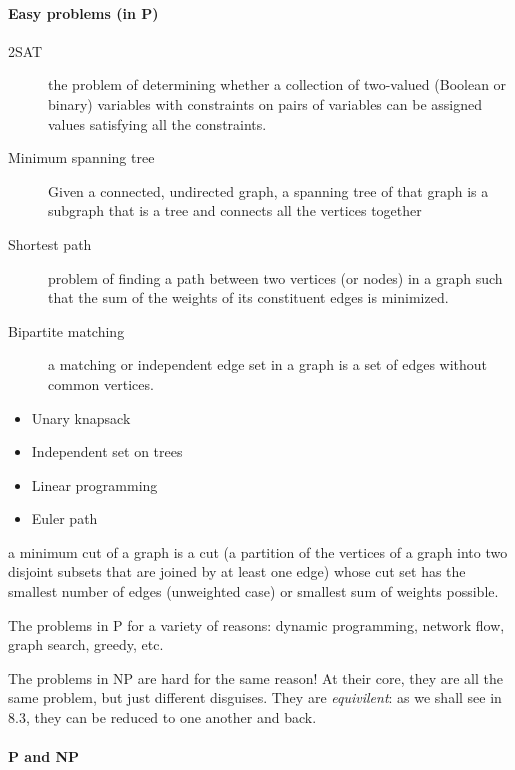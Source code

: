 \documentclass[a4paper,11pt]{article}
\begin{document}
\paragraph{Easy problems (in P)}\label{easy-problems-in-p}

\begin{description}
\item[2SAT]
the problem of determining whether a collection of two-valued (Boolean
or binary) variables with constraints on pairs of variables can be
assigned values satisfying all the constraints.
\item[Minimum spanning tree]
Given a connected, undirected graph, a spanning tree of that graph is a
subgraph that is a tree and connects all the vertices together
\item[Shortest path]
problem of finding a path between two vertices (or nodes) in a graph
such that the sum of the weights of its constituent edges is minimized.
\item[Bipartite matching]
a matching or independent edge set in a graph is a set of edges without
common vertices.
\end{description}

\begin{itemize}
\itemsep1pt\parskip0pt
\item
  Unary knapsack
\item
  Independent set on trees
\item
  Linear programming
\item
  Euler path
\end{itemize}

\begin{description}
\itemsep1pt\parskip0pt
\item[Minimum cut]
a minimum cut of a graph is a cut (a partition of the vertices of a
graph into two disjoint subsets that are joined by at least one edge)
whose cut set has the smallest number of edges (unweighted case) or
smallest sum of weights possible.
\end{description}

The problems in P for a variety of reasons: dynamic programming, network
flow, graph search, greedy, etc.

The problems in NP are hard for the same reason! At their core, they are
all the same problem, but just different disguises. They are
\emph{equivilent}: as we shall see in 8.3, they can be reduced to one
another and back.

\paragraph{P and NP}\label{p-and-np}
\end{document}
